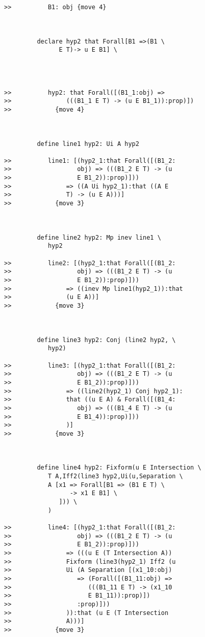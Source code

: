 \documentclass[12pt]{article}
\begin{document}
\begin{verbatim}
>>          B1: obj {move 4}



         declare hyp2 that Forall[B1 =>(B1 \
               E T)-> u E B1] \
            



>>          hyp2: that Forall([(B1_1:obj) =>
>>               (((B1_1 E T) -> (u E B1_1)):prop)])
>>            {move 4}



         define line1 hyp2: Ui A hyp2

>>          line1: [(hyp2_1:that Forall([(B1_2:
>>                  obj) => (((B1_2 E T) -> (u
>>                  E B1_2)):prop)]))
>>               => ((A Ui hyp2_1):that ((A E
>>               T) -> (u E A)))]
>>            {move 3}



         define line2 hyp2: Mp inev line1 \
            hyp2

>>          line2: [(hyp2_1:that Forall([(B1_2:
>>                  obj) => (((B1_2 E T) -> (u
>>                  E B1_2)):prop)]))
>>               => ((inev Mp line1(hyp2_1)):that
>>               (u E A))]
>>            {move 3}



         define line3 hyp2: Conj (line2 hyp2, \
            hyp2)

>>          line3: [(hyp2_1:that Forall([(B1_2:
>>                  obj) => (((B1_2 E T) -> (u
>>                  E B1_2)):prop)]))
>>               => ((line2(hyp2_1) Conj hyp2_1):
>>               that ((u E A) & Forall([(B1_4:
>>                  obj) => (((B1_4 E T) -> (u
>>                  E B1_4)):prop)]))
>>               )]
>>            {move 3}



         define line4 hyp2: Fixform(u E Intersection \
            T A,Iff2(line3 hyp2,Ui(u,Separation \
            A [x1 => Forall[B1 => (B1 E T) \
                  -> x1 E B1] \
               ])) \
            )

>>          line4: [(hyp2_1:that Forall([(B1_2:
>>                  obj) => (((B1_2 E T) -> (u
>>                  E B1_2)):prop)]))
>>               => (((u E (T Intersection A))
>>               Fixform (line3(hyp2_1) Iff2 (u
>>               Ui (A Separation [(x1_10:obj)
>>                  => (Forall([(B1_11:obj) =>
>>                     (((B1_11 E T) -> (x1_10
>>                     E B1_11)):prop)])
>>                  :prop)]))
>>               )):that (u E (T Intersection
>>               A)))]
>>            {move 3}




\end{verbatim}
\end{document}
